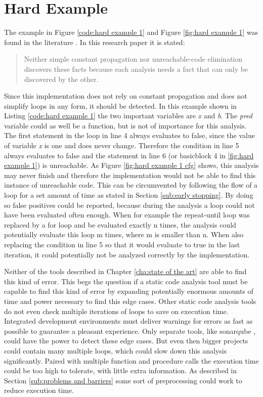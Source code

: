 \section{Hard Example}
The example in Figure \ref{code:hard example 1} and Figure \ref{fig:hard example 1} was found in the literature \cite{Click_1995}. In this research paper it is stated:
\begin{quote}
	Neither
	simple constant
	propagation
	nor unreachable-code elimination
	discovers these facts because
	each analysis
	needs a fact
	that can only be discovered
	by the other.
\end{quote}
Since this implementation does not rely on constant propagation and does not simplify loops in any form, it should be detected. In this example shown in Listing \ref{code:hard example 1} the two important variables are \emph{x} and \emph{b}. The \emph{pred} variable could as well be a function, but is not of importance for this analysis. The first statement in the loop in line 4 always evaluates to false, since the value of variable \emph{x} is one and does never change. Therefore the condition in line 5 always evaluates to false and the statement in line 6 (or basicblock 4 in \ref{fig:hard example 1}) is unreachable. As Figure \ref{fig:hard example 1 cfg} shows, this analysis may never finish and therefore the implementation would not be able to find this instance of unreachable code. This can be circumvented by following the flow of a loop for a set amount of time as stated in Section \ref{sub:early stopping}. By doing so false positives could be reported, because during the analysis a loop could not have been evaluated often enough. When for example the repeat-until loop was replaced by a for loop and be evaluated exactly n times, the analysis could potentially evaluate this loop m times, where m is smaller than n. When also replacing the condition in line 5 so that it would evaluate to true in the last iteration, it could potentially not be analyzed correctly by the implementation.

Neither of the tools described in Chapter \ref{cha:state of the art} are able to find this kind of error.
This begs the question if a static code analysis tool must be capable to find this kind of error by expanding potentially enormous amounts of time and power necessary to find this edge cases. Other static code analysis tools do not even check multiple iterations of loops to save on execution time. Integrated development environments must deliver warnings for errors as fast as possible to guarantee a pleasant experience. Only separate tools, like sonarqube \cite{sonarqube}, could have the power to detect these edge cases. But even then bigger projects could contain many multiple loops, which could slow down this analysis significantly. Paired with multiple function and procedure calls the execution time could be too high to tolerate, with little extra information. As described in Section \ref{sub:problems and barriers} some sort of preprocessing could work to reduce execution time.


